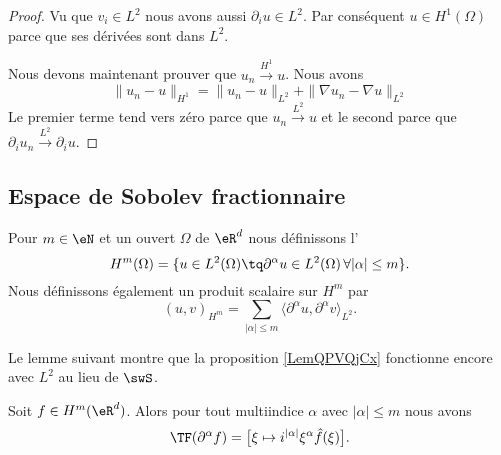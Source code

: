 \begin{proof}
    Vu que \( v_i\in L^2\) nous avons aussi \( \partial_iu\in L^2\). Par conséquent \( u\in H^1(\Omega)\) parce que ses dérivées sont dans \( L^2\).

    Nous devons maintenant prouver que \( u_n\stackrel{H^1}{\longrightarrow}u\). Nous avons
    \begin{equation}
        \| u_n-u \|_{H^1}=\| u_n -u\|_{L^2}+\| \nabla u_n-\nabla u \|_{L^2}
    \end{equation}
    Le premier terme tend vers zéro parce que \( u_n\stackrel{L^2}{\longrightarrow}u\) et le second parce que \( \partial_iu_n\stackrel{L^2}{\longrightarrow}\partial_iu\).
\end{proof}

\subsection{Espace de Sobolev fractionnaire}

\begin{definition}
    Pour \( m\in \eN\) et un ouvert \( \Omega\) de \( \eR^d\) nous définissons l'
    \begin{equation}
        H^m(\Omega)=\{ u\in L^2(\Omega)\tq \partial^{\alpha}u\in L^2(\Omega)\,\forall | \alpha |\leq m \}.
    \end{equation}
    Nous définissons également un produit scalaire sur \( H^m\) par
    \begin{equation}
        (u,v)_{H^m}=\sum_{| \alpha |\leq m}\langle \partial^{\alpha}u,  \partial^{\alpha}v  \rangle_{L^2}.
    \end{equation}
\end{definition}

Le lemme suivant montre que la proposition \ref{LemQPVQjCx} fonctionne encore avec \( L^2\) au lieu de \( \swS\).
\begin{lemma} \label{LEMooAGBZooWCbPDd}
   Soit \( f\in H^m(\eR^d)\). Alors pour tout multiindice \( \alpha\) avec \( | \alpha |\leq m\) nous avons
   \begin{equation}
       \TF(\partial^{\alpha}f)=\big[ \xi\mapsto i^{| \alpha |}\xi^{\alpha}\hat f(\xi) \big].
   \end{equation}
\end{lemma}

